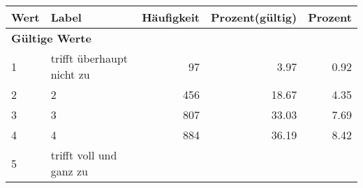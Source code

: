     \begin{longtable}{lXrrr}
     \toprule
     \textbf{Wert} & \textbf{Label} & \textbf{Häufigkeit} & \textbf{Prozent(gültig)} & \textbf{Prozent} \\
     \endhead
     \midrule
     \multicolumn{5}{l}{\textbf{Gültige Werte}}\\

     1 &
     \multicolumn{1}{X}{ trifft überhaupt nicht zu   } &


       \num{97} &
       \num[round-mode=places,round-precision=2]{3,97} &
         \num[round-mode=places,round-precision=2]{0,92} \\

     2 &
     \multicolumn{1}{X}{ 2   } &


       \num{456} &
       \num[round-mode=places,round-precision=2]{18,67} &
         \num[round-mode=places,round-precision=2]{4,35} \\

     3 &
     \multicolumn{1}{X}{ 3   } &


       \num{807} &
       \num[round-mode=places,round-precision=2]{33,03} &
         \num[round-mode=places,round-precision=2]{7,69} \\

     4 &
     \multicolumn{1}{X}{ 4   } &


       \num{884} &
       \num[round-mode=places,round-precision=2]{36,19} &
         \num[round-mode=places,round-precision=2]{8,42} \\

     5 &
     \multicolumn{1}{X}{ trifft voll und ganz zu   } &



\end{longtable}
